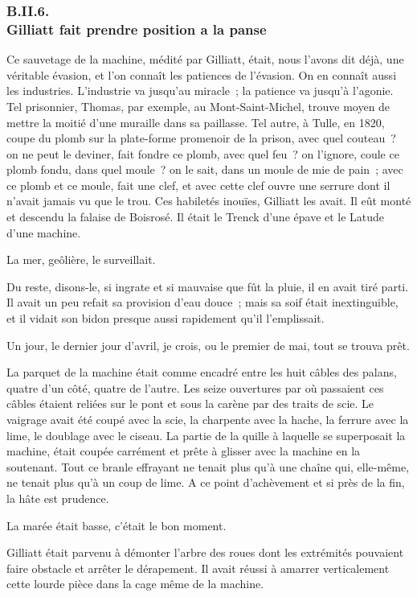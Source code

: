 \documentclass[french,twoside]{book} %
\begin{document}
 \subsubsection[{B.II.6. Gilliatt fait prendre position a la panse}]{B.II.6. \\
Gilliatt fait prendre position a la panse}
\noindent Ce sauvetage de la machine, médité par Gilliatt, était, nous l’avons dit déjà, une véritable évasion, et l’on connaît les patiences de l’évasion. On en connaît aussi les industries. L’industrie va jusqu’au miracle ; la patience va jusqu’à l’agonie. Tel prisonnier, Thomas, par exemple, au Mont-Saint-Michel, trouve moyen de mettre la moitié d’une muraille dans sa paillasse. Tel autre, à Tulle, en 1820, coupe du plomb sur la plate-forme promenoir de la prison, avec quel couteau ? on ne peut le deviner, fait fondre ce plomb, avec quel feu ? on l’ignore, coule ce plomb fondu, dans quel moule ? on le sait, dans un moule de mie de pain ; avec ce plomb et ce moule, fait une clef, et avec cette clef ouvre une serrure dont il n’avait jamais vu que le trou. Ces habiletés inouïes, Gilliatt les avait. Il eût monté et descendu la falaise de Boisrosé. Il était le Trenck d’une épave et le Latude d’une machine.\par
La mer, geôlière, le surveillait.\par
 Du reste, disons-le, si ingrate et si mauvaise que fût la pluie, il en avait tiré parti. Il avait un peu refait sa provision d’eau douce ; mais sa soif était inextinguible, et il vidait son bidon presque aussi rapidement qu’il l’emplissait.\par
Un jour, le dernier jour d’avril, je crois, ou le premier de mai, tout se trouva prêt.\par
La parquet de la machine était comme encadré entre les huit câbles des palans, quatre d’un côté, quatre de l’autre. Les seize ouvertures par où passaient ces câbles étaient reliées sur le pont et sous la carène par des traits de scie. Le vaigrage avait été coupé avec la scie, la charpente avec la hache, la ferrure avec la lime, le doublage avec le ciseau. La partie de la quille à laquelle se superposait la machine, était coupée carrément et prête à glisser avec la machine en la soutenant. Tout ce branle effrayant ne tenait plus qu’à une chaîne qui, elle-même, ne tenait plus qu’à un coup de lime. A ce point d’achèvement et si près de la fin, la hâte est prudence.\par
La marée était basse, c’était le bon moment.\par
Gilliatt était parvenu à démonter l’arbre des roues dont les extrémités pouvaient faire obstacle et arrêter le dérapement. Il avait réussi à amarrer verticalement cette lourde pièce dans la cage même de la machine.\par
\end{document}
